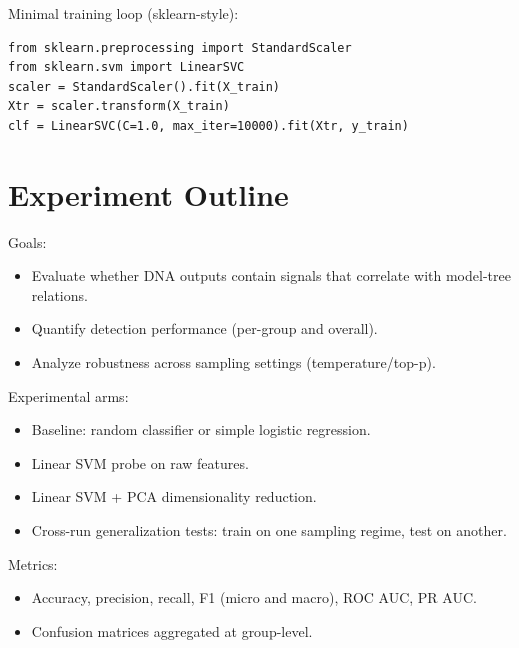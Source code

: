 \documentclass[11pt,a4paper]{article}
\begin{document}
Minimal training loop (sklearn-style):
\begin{lstlisting}[basicstyle=\ttfamily\small]
from sklearn.preprocessing import StandardScaler
from sklearn.svm import LinearSVC
scaler = StandardScaler().fit(X_train)
Xtr = scaler.transform(X_train)
clf = LinearSVC(C=1.0, max_iter=10000).fit(Xtr, y_train)
\end{lstlisting}

\section{Experiment Outline}
Goals:
\begin{itemize}
  \item Evaluate whether DNA outputs contain signals that correlate with model-tree relations.
  \item Quantify detection performance (per-group and overall).
  \item Analyze robustness across sampling settings (temperature/top-p).
\end{itemize}

Experimental arms:
\begin{itemize}
  \item Baseline: random classifier or simple logistic regression.
  \item Linear SVM probe on raw features.
  \item Linear SVM + PCA dimensionality reduction.
  \item Cross-run generalization tests: train on one sampling regime, test on another.
\end{itemize}

Metrics:
\begin{itemize}
  \item Accuracy, precision, recall, F1 (micro and macro), ROC AUC, PR AUC.
  \item Confusion matrices aggregated at group-level.
\end{itemize}
\end{document}
